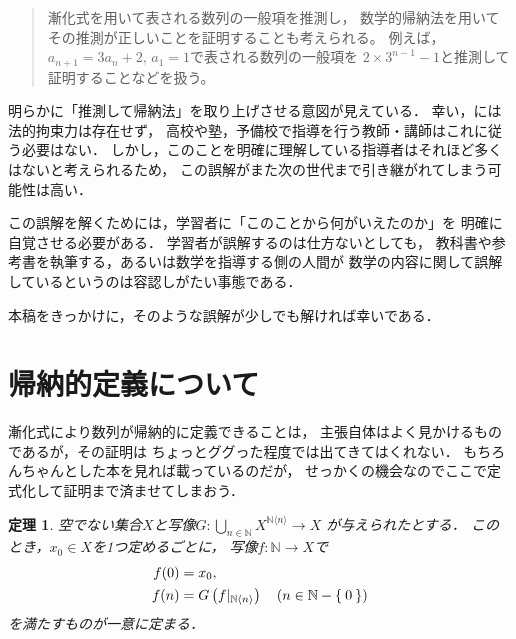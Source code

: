 \documentclass[11pt,a4paper]{ltjsarticle} %
\theoremstyle{mystyle} %
\newtheorem{thm}{定理} %
\begin{document}
\begin{quote}
  漸化式を用いて表される数列の一般項を推測し，
  数学的帰納法を用いてその推測が正しいことを証明することも考えられる。
  例えば，$a_{n+1} = 3 a_n + 2 , \, a_1=1$で表される数列の一般項を
  $2 \times 3^{n-1} -1 $と推測して証明することなどを扱う。
\end{quote}

明らかに「推測して帰納法」を取り上げさせる意図が見えている．
幸い，\cite{youryoukai}には法的拘束力は存在せず，
高校や塾，予備校で指導を行う教師・講師はこれに従う必要はない．
しかし，このことを明確に理解している指導者はそれほど多くはないと考えられるため，
この誤解がまた次の世代まで引き継がれてしまう可能性は高い．

この誤解を解くためには，学習者に「このことから何がいえたのか」を
明確に自覚させる必要がある．
学習者が誤解するのは仕方ないとしても，
教科書や参考書を執筆する，あるいは数学を指導する側の人間が
数学の内容に関して誤解しているというのは容認しがたい事態である．

本稿をきっかけに，そのような誤解が少しでも解ければ幸いである．


\section{帰納的定義について}

漸化式により数列が帰納的に定義できることは，
主張自体はよく見かけるものであるが，その証明は
ちょっとググった程度では出てきてはくれない．
もちろんちゃんとした本を見れば載っているのだが，
せっかくの機会なのでここで定式化して証明まで済ませてしまおう．

\begin{thm} \label{thm:inddef}
  空でない集合$X$と写像$G \colon \bigcup_{n \in \mathbb{N} } 
  X^{\mathbb{N} \langle n \rangle} \longrightarrow X$
  が与えられたとする．
  このとき，$x_0 \in X$を1つ定めるごとに，
  写像$f \colon \mathbb{N} \longrightarrow X$で
  \begin{align}
    \begin{aligned}
      f(0) & = x_0 , \\
      f(n) & = G \left( f|_{\mathbb{N} \langle n \rangle} \right)
      \quad ( n \in \mathbb{N} - \Set{0} )
    \end{aligned}
    \label{eq:inddef}
  \end{align}
  を満たすものが一意に定まる．
\end{thm}
\end{document}

